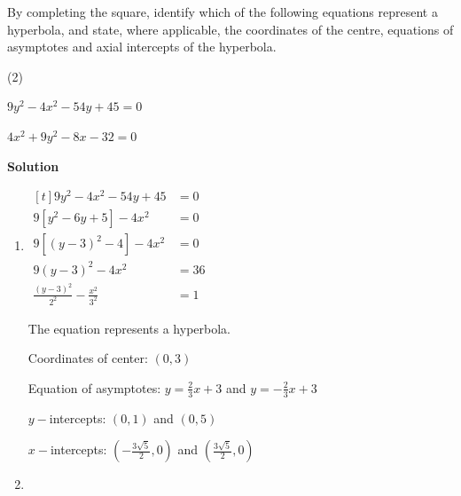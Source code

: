 \documentclass[11pt,a4paper]{book}
\begin{document}
\medskip{}

\begin{example}{}

By completing the square, identify which of the following equations
represent a hyperbola, and state, where applicable, the coordinates
of the centre, equations of asymptotes and axial intercepts of the
hyperbola.

\begin{tasks}[label=(\alph*),label-width=3.5ex](2)

\task  $9y^{2}-4x^{2}-54y+45=0$

\task  $4x^{2}+9y^{2}-8x-32=0$

\end{tasks}

\textbf{Solution}

\begin{enumerate}[label=(\alph*)]

\item

\begin{minipage}[t]{0.36\textwidth}

$
\begin{aligned}[t]
9y^{2}-4x^{2}-54y+45 & =0\\
9\left[y^{2}-6y+5\right]-4x^{2} & =0\\
9\left[\left(y-3\right)^{2}-4\right]-4x^{2} & =0\\
9\left(y-3\right)^{2}-4x^{2} & =36\\
\frac{\left(y-3\right)^{2}}{2^{2}}-\frac{x^{2}}{3^{2}} & =1
\end{aligned}
$

\end{minipage}
\begin{minipage}[t]{0.6\textwidth}

The equation represents a hyperbola.

Coordinates of center: $\left(0,3\right)$

Equation of asymptotes: ${\displaystyle y=\frac{2}{3}x+3}$ and ${\displaystyle y=-\frac{2}{3}x+3}$

$y-$intercepts: $\left(0,1\right)$ and $\left(0,5\right)$

$x-$intercepts: ${\displaystyle \left(-\frac{3\sqrt{5}}{2},0\right)}$
and ${\displaystyle \left(\frac{3\sqrt{5}}{2},0\right)}$

\end{minipage}

\item


\end{enumerate}
\end{example}
\end{document}
